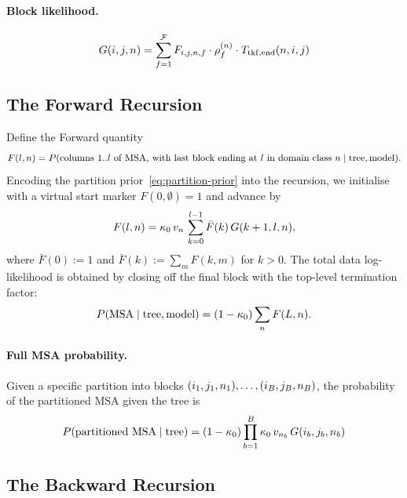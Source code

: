 \paragraph{Block likelihood.}
\begin{equation}
G(i, j, n) = \sum_{f=1}^{\mathcal{F}} F_{i,j,n,f} \cdot \rho^{(n)}_f \cdot T_{\mathrm{tkf,end}}(n, i, j)
\label{eq:block-likelihood}
\end{equation}

\subsection{The Forward Recursion}
\label{sec:forward-recursion}

Define the Forward quantity
\begin{equation}
  F(l, n) = P(\text{columns } 1..l \text{ of MSA, with last block ending at } l
  \text{ in domain class } n \mid \text{tree}, \text{model}).
\end{equation}
Encoding the partition prior~\eqref{eq:partition-prior} into the
recursion, we initialise with a virtual start marker $F(0, \emptyset) = 1$
and advance by
\begin{equation}
  F(l, n) = \kappa_0\, v_{n}\,
  \sum_{k=0}^{l-1} \bar F(k)\, G(k+1, l, n),
  \label{eq:forward-compact}
\end{equation}
where $\bar F(0) := 1$ and $\bar F(k) := \sum_m F(k,m)$ for $k > 0$.
The total data log-likelihood is obtained by closing off the final
block with the top-level termination factor:
\begin{equation}
  P(\text{MSA}\mid\text{tree},\text{model})
  = (1-\kappa_0) \sum_{n} F(L, n).
  \label{eq:total-ll}
\end{equation}

\paragraph{Full MSA probability.}
Given a specific partition into blocks $(i_1,j_1,n_1), \ldots, (i_B,j_B,n_B)$,
the probability of the partitioned MSA given the tree is
\[
P(\text{partitioned MSA} \mid \text{tree}) = (1-\kappa_0) \prod_{b=1}^{B} \kappa_0\, v_{n_b}\, G(i_b, j_b, n_b)
\]

\subsection{The Backward Recursion}
\label{sec:backward-recursion}

